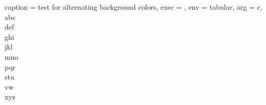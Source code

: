 \documentclass{article}
\begin{document}
\begin{tableobject}{%
	caption = test for alternating background colors,
	exec = ,
	env = tabular,
	arg = c,
}
	abc \\
	def \\
	ghi \\
	jkl \\
	mno \\
	pqr \\
	stu \\
	vw  \\
	xyz \\
\end{tableobject}
\end{document}
